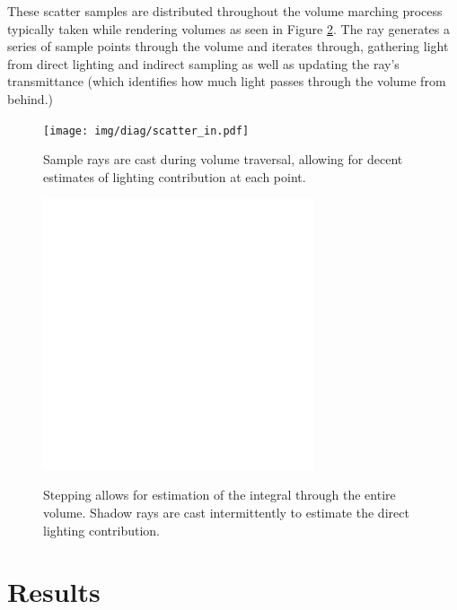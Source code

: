 \documentclass[12pt]{ucthesis}
\newcommand{\captionfonts}{\small\bf\ssp}
\begin{document}
These scatter samples are distributed throughout the volume marching process typically taken while rendering volumes as seen in Figure \ref{fig:vol_step}.  The ray generates a series of sample points through the volume and iterates through, gathering light from direct lighting and indirect sampling as well as updating the ray's transmittance (which identifies how much light passes through the volume from behind.)


\begin{figure}[h!]
    \centering
    \texttt{[image: img/diag/scatter\_in.pdf]}
    \captionfonts
    \caption{Sample rays are cast during volume traversal, allowing for decent estimates of lighting contribution at each point.}
    \label{fig:scatter_in}
\end{figure}


\begin{figure}[h!]
    \centering
    \includegraphics[width=80mm]{img/diag/vol_step.pdf}
    \captionfonts
    \caption{Stepping allows for estimation of the integral through the entire volume.  Shadow rays are cast intermittently to estimate the direct lighting contribution. }
    \label{fig:vol_step}
\end{figure}

\chapter{Results}
\end{document}
